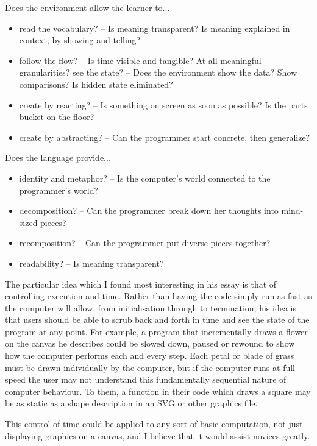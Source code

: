 Does the environment allow the learner to...
\begin{itemize}
\item read the vocabulary? -- Is meaning transparent? Is meaning explained in context, by showing and telling?
\item follow the flow? -- Is time visible and tangible? At all meaningful granularities?
see the state? -- Does the environment show the data? Show comparisons? Is hidden state eliminated?
\item create by reacting? -- Is something on screen as soon as possible? Is the parts bucket on the floor?
\item create by abstracting? -- Can the programmer start concrete, then generalize?
\end{itemize}
Does the language provide...
\begin{itemize}
\item identity and metaphor? -- Is the computer's world connected to the programmer's world?
\item decomposition? -- Can the programmer break down her thoughts into mind-sized pieces?
\item recomposition? -- Can the programmer put diverse pieces together?
\item readability? -- Is meaning transparent?
\end{itemize}

The particular idea which I found most interesting in his essay is that of controlling execution and time. Rather than having the code simply run as fast as the computer will allow, from initialisation through to termination, his idea is that users should be able to scrub back and forth in time and see the state of the program at any point. For example, a program that incrementally draws a flower on the canvas he describes could be slowed down, paused or rewound to show how the computer performs each and every step. Each petal or blade of grass must be drawn individually by the computer, but if the computer runs at full speed the user may not understand this fundamentally sequential nature of computer behaviour. To them, a function in their code which draws a square may be as static as a shape description in an SVG or other graphics file.

This control of time could be applied to any sort of basic computation, not just displaying graphics on a canvas, and I believe that it would assist novices greatly.